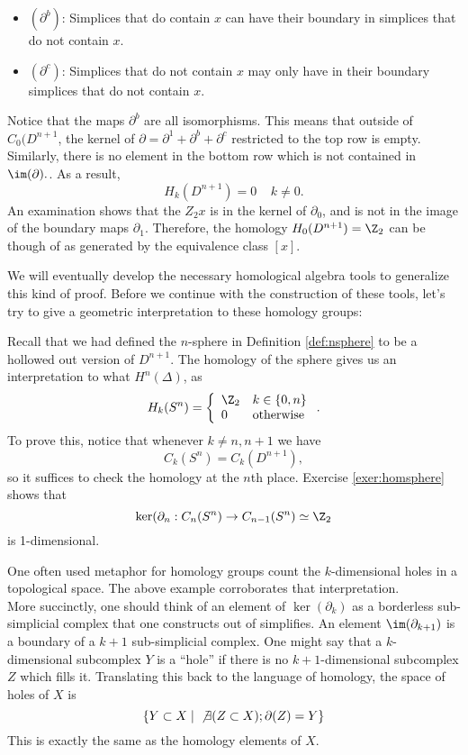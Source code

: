 \begin{example}
\begin{itemize}
\item  $(\partial^b)$: Simplices that do contain $x$ can have their boundary in simplices that do not contain $x$. 
\item  $(\partial^c)$: Simplices that do not contain $x$ may only have in their boundary simplices that do not contain $x$. 
\end{itemize}
Notice that the maps $\partial^b$ are all isomorphisms. This means that outside of $C_0(D^{n+1}$, the kernel of $\partial=\partial^1+\partial^b+\partial^c$ restricted to the top row is empty. Similarly, there is no element in the bottom row which is not contained in $\im(\partial).$. As a result, 
\[H_k(D^{n+1})=0 \;\;\;\; k\neq 0.\]
An examination shows that the $Z_2{x}$ is in the kernel of $\partial_0$, and is not in the image of the boundary maps $\partial_1$. Therefore, the homology $H_0(D^{n+1})=\Z_2$ can be though of as generated by the equivalence class $[x]$. 
\end{example}
We will eventually develop the necessary homological algebra tools to generalize this kind of proof. Before we continue with the construction of these tools, let's try to give a geometric interpretation to these homology groups:
\begin{example}
Recall that we had defined the $n$-sphere in Definition \ref{def:nsphere} to be a hollowed out version of $D^{n+1}$. The homology of the sphere gives us an interpretation to what $H^n(\Delta)$, as 
\[
H_k(S^n)=\left\{\begin{array}{ll} \Z_2 & k\in \{0, n\}\\ 0 & \text{otherwise}\end{array}\right. .\]
To prove this, notice that whenever $k\neq n, n+1$ we have 
\[C_k(S^{n})=C_k(D^{n+1}),\]
so it suffices to check the homology at the $n$th place. Exercise \ref{exer:homsphere} shows that 
\[\ker (\partial_{n}: C_n(S^{n})\to C_{n-1}(S^{n})\simeq \Z_2\] is 1-dimensional. 
\end{example}
One often used metaphor for homology groups count the $k$-dimensional holes in a topological space. The above example corroborates that interpretation. \\
More succinctly, one should think of an element of $\ker(\partial_k)$ as a borderless sub-simplicial complex that one constructs out of simplifies. An element $\im(\partial_{k+1})$ is a boundary of a $k+1$ sub-simplicial complex. One might say that a $k$-dimensional subcomplex $Y$ is a ``hole'' if there is no $k+1$-dimensional subcomplex $Z$ which fills it. Translating this back to the language of homology, the space of holes of $X$ is 
\[\{Y\subset X \;|\; \not \exists (Z\subset X) ; \partial(Z)=Y\}\]
This is exactly the same as the homology elements of $X$. 

